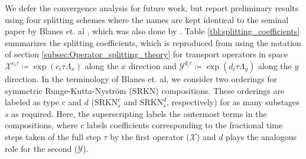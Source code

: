 \documentclass[11pt,titlepage]{report}
\begin{document}
We defer the convergence analysis for future work, but report preliminary results using four splitting schemes where the names are kept identical to the seminal paper by Blanes et. al \cite{Blanes02}, which was also done by \cite{Guclu14}. Table \ref{tbl:splitting_coefficients} summarizes the splitting coefficients, which is reproduced from \cite{Blanes02} using the notation of section \ref{subsec:Operator_splitting_theory} for transport operators in space $\mathcal{X}^{c_i\tau} \coloneqq \exp(c_i\tau\Lambda_x)$ along the $x$ direction and $\mathcal{Y}^{d_i\tau} \coloneqq \exp(d_i\tau\Lambda_y)$ along the $y$ direction.  In the terminology of Blanes et. al, we consider two orderings for symmetric Runge-Kutta-Nystr\"{o}m (SRKN) compositions. These orderings are labeled as type $c$ and $d$ ($\text{SRKN}_s^c$ and $\text{SRKN}_s^d$, respectively) for as many substages $s$ as required. Here, the superscripting labels the outermost terms in the compositions, where $c$ labels coefficients corresponding to the fractional time steps taken of the full step $\tau$ by the first operator ($\mathcal{X}$) and $d$ plays the analogous role for the second ($\mathcal{Y}$).

\newpage
\end{document}

